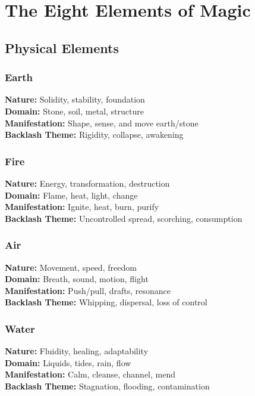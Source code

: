 \section{The Eight Elements of Magic}
\label{sec:eight-elements}

\subsection{Physical Elements}
\label{subsec:physical-elements}

\subsubsection{Earth}
\label{subsubsec:earth-element}
\textbf{Nature:} Solidity, stability, foundation\\
\textbf{Domain:} Stone, soil, metal, structure\\
\textbf{Manifestation:} Shape, sense, and move earth/stone\\
\textbf{Backlash Theme:} Rigidity, collapse, awakening

\subsubsection{Fire}
\label{subsubsec:fire-element}
\textbf{Nature:} Energy, transformation, destruction\\
\textbf{Domain:} Flame, heat, light, change\\
\textbf{Manifestation:} Ignite, heat, burn, purify\\
\textbf{Backlash Theme:} Uncontrolled spread, scorching, consumption

\subsubsection{Air}
\label{subsubsec:air-element}
\textbf{Nature:} Movement, speed, freedom\\
\textbf{Domain:} Breath, sound, motion, flight\\
\textbf{Manifestation:} Push/pull, drafts, resonance\\
\textbf{Backlash Theme:} Whipping, dispersal, loss of control

\subsubsection{Water}
\label{subsubsec:water-element}
\textbf{Nature:} Fluidity, healing, adaptability\\
\textbf{Domain:} Liquids, tides, rain, flow\\
\textbf{Manifestation:} Calm, cleanse, channel, mend\\
\textbf{Backlash Theme:} Stagnation, flooding, contamination

